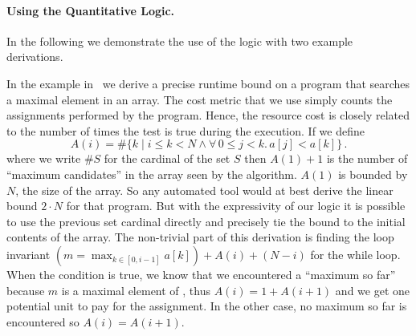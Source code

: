 \documentclass[nocopyrightspace,preprint,pldi]{sigplanconf-pldi15}
\newcommand{\pref}[1]{\prettyref{#1}}
\begin{document}
\paragraph{Using the Quantitative Logic.}

In the following we demonstrate the use of the logic with two example
derivations.

In the example in~\pref{fig:xmplmax} we derive a precise runtime
bound on a program that searches a maximal element in an array.  The
cost metric that we use simply counts the assignments performed by the
program.  Hence, the resource cost is closely related to the
number of times the test  is true during the
execution.
%
If we define
$$
 A(i) =  \# \{ k \mid i \le k < N \land \forall\, 0 \le j < k.\, a[j] < a[k] \} \, .
$$
where we write $\# S$ for the cardinal of the set $S$ then $A(1)+1$ is
the number of ``maximum candidates'' in the array  seen
by the algorithm. $A(1)$ is bounded by $N$, the size of the array.
So any automated tool would at best derive the linear bound $2 \cdot
N$ for that program.  But with the expressivity of our logic it is
possible to use the previous set cardinal directly and precisely tie
the bound to the initial contents of the array.
%
The non-trivial part of this derivation is finding the loop invariant
$(m = \max_{k \in [0, i-1]} a[k]) + A(i) + (N-i)$ for the while loop.
When the condition  is true, we know that we
encountered a ``maximum so far'' because $m$ is a maximal element of
, thus $A(i) = 1 + A(i+1)$ and we get one
potential unit to pay for the assignment.  In the other case, no
maximum so far is encountered so $A(i) = A(i+1)$.
\end{document}
